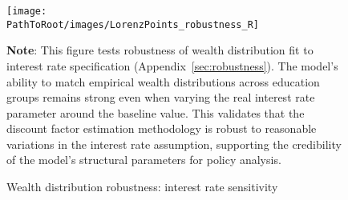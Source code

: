 \documentclass[\PathToRoot/\ProjectName]{subfiles}
\begin{document}
\begin{figure}[htb] 
  \centering
  \caption{Wealth distribution robustness: interest rate sensitivity}
  \whenintegrated{\label{fig:LorenzPts_robustness_R}} 
  \texttt{[image: \\PathToRoot/images/LorenzPoints\_robustness\_R]}

  \medskip
  \noindent\parbox{\textwidth}{\footnotesize
    \textbf{Note}: This figure tests robustness of wealth distribution fit to interest rate specification
    (Appendix~\ref{sec:robustness}).
    The model's ability to match empirical wealth distributions across education groups
    remains strong even when varying the real interest rate parameter around the baseline value.
    This validates that the discount factor estimation methodology is robust to reasonable
    variations in the interest rate assumption, supporting the credibility of the model's
    structural parameters for policy analysis.
  }
\end{figure}

\smartbib
\end{document}
